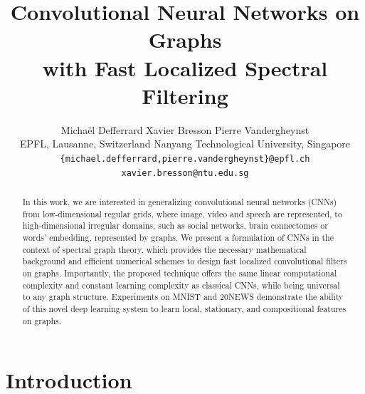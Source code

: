 \documentclass{article}
\title{Convolutional Neural Networks on Graphs\\
with Fast Localized Spectral Filtering\\}
\author{
	Michaël Defferrard\affe \hspace{1cm} Xavier Bresson\affs \hspace{1cm} Pierre Vandergheynst\affe %
	\vspace{0.2cm} \\
	\affe EPFL, Lausanne, Switzerland \hspace{1cm} \affs Nanyang Technological University, Singapore \\
	\texttt{\{michael.defferrard,pierre.vandergheynst\}@epfl.ch \hfill xavier.bresson@ntu.edu.sg} \\
}
\begin{document}
\maketitle

\begin{abstract}

In this work, we are interested in generalizing convolutional neural networks
(CNNs) from low-dimensional regular grids, where image, video and speech are
represented, to high-dimensional irregular domains, such as social networks,
brain connectomes or words' embedding, represented by graphs.
We present a formulation of CNNs in the context of spectral graph theory, which
provides the necessary mathematical background and efficient numerical schemes
to design fast localized convolutional filters on graphs. Importantly, the
proposed technique offers the same linear computational complexity and constant
learning complexity as classical CNNs, while being universal to any graph
structure. Experiments on MNIST and 20NEWS demonstrate the ability of this
novel deep learning system to learn local, stationary, and compositional
features on graphs.

	
\end{abstract}


\section{Introduction}


\end{document}
